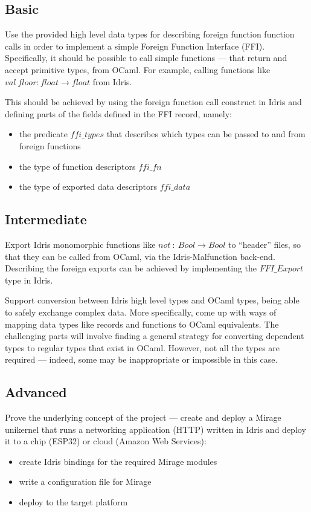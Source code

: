 \documentclass[a4paper]{report}
\begin{document}
\subsection{Basic}
Use the provided high level data types for describing foreign function
function calls in order to implement a simple Foreign Function Interface (FFI).
Specifically, it should be possible to call simple
functions --- that return
and accept primitive types, from OCaml.
For example, calling functions like
$val \ floor : float \rightarrow float$ from Idris.

This should be achieved by using the foreign function call construct in Idris
and defining parts of the fields defined in the FFI record, namely:
\begin{itemize}
	\item the predicate $ffi\_types$ that describes which types can be
	      passed to and from foreign functions
	\item the type of function descriptors $ffi\_fn$
	\item the type of exported data descriptors $ffi\_data$
\end{itemize}

\subsection{Intermediate}
Export Idris monomorphic functions like
$not \ : \ Bool \rightarrow Bool$ to ``header'' files, so that they can be
called from OCaml, via the Idris-Malfunction back-end.
Describing the foreign exports can be achieved by implementing the
$FFI\_Export$ type in Idris.

Support conversion between Idris high level types and OCaml types,
being able to safely exchange complex data.
More specifically, come up with ways of mapping data types like records and
functions to OCaml equivalents.
The challenging parts will involve finding a general strategy for converting
dependent types to regular types that exist in OCaml. However, not all the types are required --- indeed, some may be inappropriate or impossible in this
case.

\subsection{Advanced}
Prove the underlying concept of the project --- create and deploy a Mirage
unikernel that runs a networking application (HTTP) written in Idris and
deploy it to a chip (ESP32) or cloud (Amazon Web Services):
\begin{itemize}
	\item create Idris bindings for the required Mirage modules
	\item write a configuration file for Mirage
	\item deploy to the target platform
\end{itemize}
\end{document}
